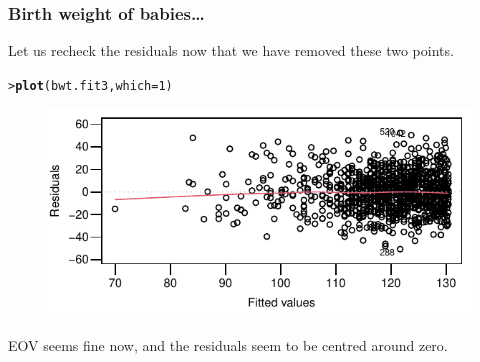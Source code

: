 \documentclass{beamer}\usepackage[]{graphicx}\usepackage[]{xcolor}
\makeatletter
\newcommand{\hlnum}[1]{\textcolor[rgb]{0.686,0.059,0.569}{#1}}%
\newcommand{\hlstd}[1]{\textcolor[rgb]{0.345,0.345,0.345}{#1}}%
\newcommand{\hlkwc}[1]{\textcolor[rgb]{0.333,0.667,0.333}{#1}}%
\newcommand{\hlkwd}[1]{\textcolor[rgb]{0.737,0.353,0.396}{\textbf{#1}}}%
\newenvironment{kframe}{%
 \def\at@end@of@kframe{}%
 \ifinner\ifhmode%
  \def\at@end@of@kframe{\end{minipage}}%
  \begin{minipage}{\columnwidth}%
 \fi\fi%
 \def\FrameCommand##1{\hskip\@totalleftmargin \hskip-\fboxsep
 \colorbox{shadecolor}{##1}\hskip-\fboxsep
     \hskip-\linewidth \hskip-\@totalleftmargin \hskip\columnwidth}%
 \MakeFramed {\advance\hsize-\width
   \@totalleftmargin\z@ \linewidth\hsize
   \@setminipage}}%
 {\par\unskip\endMakeFramed%
 \at@end@of@kframe}
\newenvironment{knitrout}{}{} %
\makeatother
\begin{document}
\begin{frame}[fragile]
\frametitle{Birth weight of babies\ldots}
Let us recheck the residuals now that we have removed these two points.
\begin{knitrout}\scriptsize
{}\color{fgcolor}\begin{kframe}
\begin{alltt}
\hlstd{> }\hlkwd{plot}\hlstd{(bwt.fit3,}\hlkwc{which}\hlstd{=}\hlnum{1}\hlstd{)}
\end{alltt}
\end{kframe}
\end{knitrout}



\begin{figure}
  \centering
  \includegraphics{figure/RC-H10-030}
\end{figure}

EOV seems fine now, and the residuals seem to be centred around zero.
\end{frame}
\end{document}
